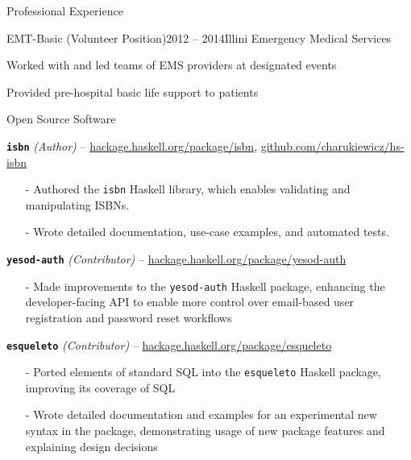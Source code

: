 \documentclass{resume} %
\begin{document}
\begin{rSection}{Professional Experience}

\begin{rSubsection}{EMT-Basic (Volunteer Position)}{2012 -- 2014}{Illini Emergency Medical Services}{}
  \item Worked with and led teams of EMS providers at designated events
  \item Provided pre-hospital basic life support to patients
\end{rSubsection}

\end{rSection}


\begin{rSection}{Open Source Software}

\begin{rListSection}
\item \textbf{\texttt{isbn}} {\em (Author)} -- \href{https://hackage.haskell.org/package/isbn}{hackage.haskell.org/package/isbn}, \href{https://github.com/charukiewicz/hs-isbn}{github.com/charukiewicz/hs-isbn}
    \begin{itemize} \itemsep -0.5em \vspace{-0.5em}
    \item[-] Authored the \texttt{isbn} Haskell library, which enables validating and manipulating ISBNs.
    \item[-] Wrote detailed documentation, use-case examples, and automated tests.
    \end{itemize}
\item \textbf{\texttt{yesod-auth}} {\em (Contributor)} -- \href{https://hackage.haskell.org/package/yesod-auth}{hackage.haskell.org/package/yesod-auth}
    \begin{itemize} \itemsep -0.5em \vspace{-0.5em}
    \item[-] Made improvements to the \texttt{yesod-auth} Haskell package, enhancing the developer-facing API to enable more control over email-based user registration and password reset workflows
    \end{itemize}
\item \textbf{\texttt{esqueleto}} {\em (Contributor)} -- \href{https://hackage.haskell.org/package/esqueleto}{hackage.haskell.org/package/esqueleto}
    \begin{itemize} \itemsep -0.5em \vspace{-0.5em}
    \item[-] Ported elements of standard SQL into the \texttt{esqueleto} Haskell package, improving its coverage of SQL
    \item[-] Wrote detailed documentation and examples for an experimental new syntax in the package, demonstrating usage of new package features and explaining design decisions
    \end{itemize}
\end{rListSection}

\end{rSection}
\end{document}
